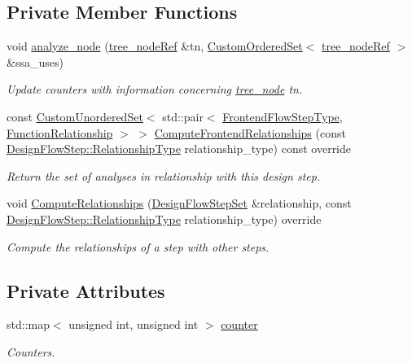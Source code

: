 \subsection*{Private Member Functions}
\begin{DoxyCompactItemize}
\item 
void \hyperlink{classuse__counting_a7772a13ea271918f8f5d3136d73e05d7}{analyze\+\_\+node} (\hyperlink{tree__node_8hpp_a6ee377554d1c4871ad66a337eaa67fd5}{tree\+\_\+node\+Ref} \&tn, \hyperlink{classCustomOrderedSet}{Custom\+Ordered\+Set}$<$ \hyperlink{tree__node_8hpp_a6ee377554d1c4871ad66a337eaa67fd5}{tree\+\_\+node\+Ref} $>$ \&ssa\+\_\+uses)
\begin{DoxyCompactList}\small\item\em Update counters with information concerning \hyperlink{classtree__node}{tree\+\_\+node} tn. \end{DoxyCompactList}\item 
const \hyperlink{classCustomUnorderedSet}{Custom\+Unordered\+Set}$<$ std\+::pair$<$ \hyperlink{frontend__flow__step_8hpp_afeb3716c693d2b2e4ed3e6d04c3b63bb}{Frontend\+Flow\+Step\+Type}, \hyperlink{classFrontendFlowStep_af7cf30f2023e5b99e637dc2058289ab0}{Function\+Relationship} $>$ $>$ \hyperlink{classuse__counting_a8a110f0d3c446c00cbdbe88a465e24d8}{Compute\+Frontend\+Relationships} (const \hyperlink{classDesignFlowStep_a723a3baf19ff2ceb77bc13e099d0b1b7}{Design\+Flow\+Step\+::\+Relationship\+Type} relationship\+\_\+type) const override
\begin{DoxyCompactList}\small\item\em Return the set of analyses in relationship with this design step. \end{DoxyCompactList}\item 
void \hyperlink{classuse__counting_ae50eb0e5cc8c9e0a5c6a630ac6765f59}{Compute\+Relationships} (\hyperlink{classDesignFlowStepSet}{Design\+Flow\+Step\+Set} \&relationship, const \hyperlink{classDesignFlowStep_a723a3baf19ff2ceb77bc13e099d0b1b7}{Design\+Flow\+Step\+::\+Relationship\+Type} relationship\+\_\+type) override
\begin{DoxyCompactList}\small\item\em Compute the relationships of a step with other steps. \end{DoxyCompactList}\end{DoxyCompactItemize}
\subsection*{Private Attributes}
\begin{DoxyCompactItemize}
\item 
std\+::map$<$ unsigned int, unsigned int $>$ \hyperlink{classuse__counting_ad40a38317279077e2bb55e5a61c72f2c}{counter}
\begin{DoxyCompactList}\small\item\em Counters. \end{DoxyCompactList}\end{DoxyCompactItemize}
